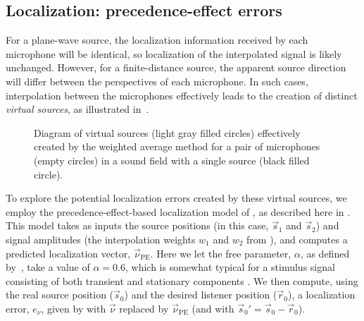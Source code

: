 \subsection{Localization: precedence-effect errors}
For a plane-wave source, the localization information received by each microphone will be identical, so localization of the interpolated signal is likely unchanged.
However, for a finite-distance source, the apparent source direction will differ between the perspectives of each microphone.
In such cases, interpolation between the microphones effectively leads to the creation of distinct \textit{virtual sources}, as illustrated in~.

\begin{figure}[t]
\centering
  
  \caption[Diagram of virtual sources created by the weighted average method.]{
  Diagram of virtual sources (light gray filled circles) effectively created by the weighted average method for a pair of microphones (empty circles) in a sound field with a single source (black filled circle).}
  \label{fig:08_Proposed_Method:Effective_Sources}
\end{figure}

To explore the potential localization errors created by these virtual sources, we employ the precedence-effect-based localization model of \citet{Stitt2016}, as described here in .
This model takes as inputs the source positions (in this case, $\vec{s}_1$ and $\vec{s}_2$) and signal amplitudes (the interpolation weights $w_1$ and $w_2$ from ), and computes a predicted localization vector, $\vec{\nu}_\text{PE}$.
Here we let the free parameter, $\alpha$, as defined by~\citeauthor{Stitt2016}, take a value of $\alpha = 0.6$, which is somewhat typical for a stimulus signal consisting of both transient and stationary components \citep{Stitt2016}.
We then compute, using the real source position ($\vec{s}_0$) and the desired listener position ($\vec{r}_0$), a localization error, $e_\nu$, given by  with $\vec{\nu}$ replaced by $\vec{\nu}_\text{PE}$ (and with $\vec{s}_0{}' = \vec{s}_0 - \vec{r}_0$).

